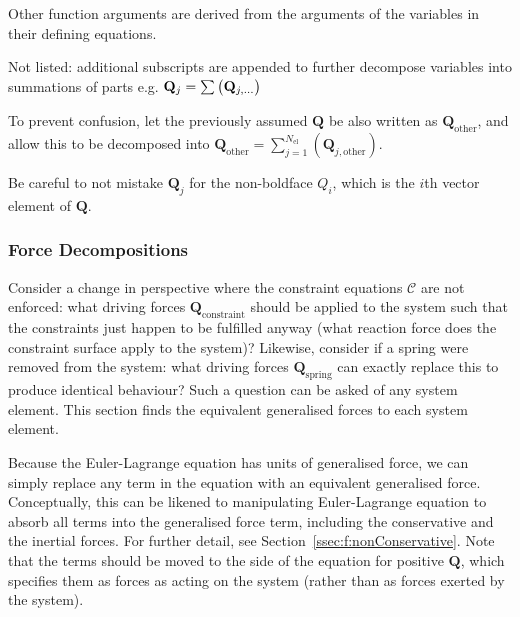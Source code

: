 \documentclass[11pt]{article}
\renewcommand{\secref}[1]{Section~\ref{#1}}
\begin{document}
\begin{center}
\begin{threeparttable}
\begin{tablenotes}
    \item[\textbullet] Other function arguments are derived from the arguments of the variables in their defining equations.
    \item[\textbullet] Not listed: additional subscripts are appended to further decompose variables into summations of parts e.g. $\mathbf{Q}_{j}=\sum\del{\mathbf{Q}_{j,...}}$
    \item[1] To prevent confusion, let the previously assumed $\mathbf{Q}$ be also written as $\mathbf{Q}_{\mathrm{other}}$, and allow this to be decomposed into $\mathbf{Q}_{\mathrm{other}}=\sum_{j=1}^{N_\mathrm{el}}(\mathbf{Q}_{j,\mathrm{other}})$.
    \item[2] Be careful to not mistake $\mathbf{Q}_{j}$ for the non-boldface $Q_i$, which is the $i$th vector element of $\mathbf{Q}$.
\end{tablenotes}
\end{threeparttable}
\end{center}


\subsubsection{Force Decompositions} \label{sssec:d:decomposition:force}
Consider a change in perspective where the constraint equations $\bm{\mathcal{C}}$ are not enforced: what driving forces $\mathbf{Q}_{\mathrm{constraint}}$ should be applied to the system such that the constraints just happen to be fulfilled anyway (what reaction force does the constraint surface apply to the system)? Likewise, consider if a spring were removed from the system: what driving forces $\mathbf{Q}_{\mathrm{spring}}$ can exactly replace this to produce identical behaviour? Such a question can be asked of any system element. This section finds the equivalent generalised forces to each system element.

Because the Euler-Lagrange equation has units of generalised force, we can simply replace any term in the equation with an equivalent generalised force. Conceptually, this can be likened to manipulating Euler-Lagrange equation to absorb all terms into the generalised force term, including the conservative and the inertial forces. For further detail, see \secref{ssec:f:nonConservative}. Note that the terms should be moved to the side of the equation for positive $\mathbf{Q}$, which specifies them as forces as acting on the system (rather than as forces exerted by the system).
\end{document}
